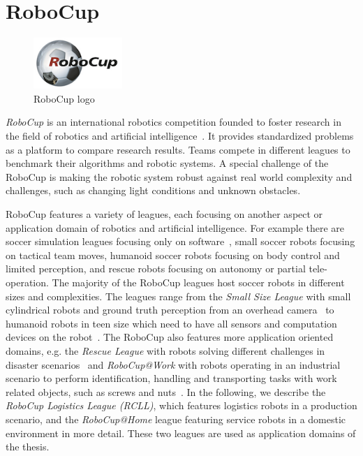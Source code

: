   
\section{RoboCup}
\label{sec:robocup}
\begin{figure}
  \centering
  \vspace{-2.7ex}
  \includegraphics[width=0.3\textwidth]{img/robocup-logo}
  \vspace{-4ex}
  \caption[RoboCup logo]{RoboCup logo}
  \label{fig:rcll}
  \vspace{-2ex}
\end{figure}
\emph{RoboCup} is an international robotics competition founded to
foster research in the field of robotics and artificial
intelligence~\cite{RoboCup-Paper,Gazsim-Thesis}. It provides
standardized problems as a platform to compare research results. Teams
compete in different leagues to benchmark their algorithms and robotic
systems. A special challenge of the RoboCup is making the robotic
system robust against real world complexity and challenges, such as
changing light conditions and unknown obstacles.

RoboCup features a variety of leagues, each focusing on another aspect
or application domain of robotics and artificial intelligence.  For
example there are soccer simulation leagues focusing only on
software~\cite{simspark_old}, small soccer robots focusing on tactical
team moves, humanoid soccer robots focusing on body control and
limited perception, and rescue robots focusing on autonomy or partial
tele-operation. The majority of the RoboCup leagues host soccer robots
in different sizes and complexities. The leagues range from the
\emph{Small Size League} with small cylindrical robots and ground
truth perception from an overhead camera~\cite{rc-ssl} to humanoid
robots in teen size which need to have all sensors and computation
devices on the robot~\cite{rc-book}. The RoboCup also features more
application oriented domains, e.g. the \emph{Rescue League} with
robots solving different challenges in disaster
scenarios~\cite{rc-rescue} and \emph{RoboCup@Work} with robots
operating in an industrial scenario to perform identification,
handling and transporting tasks with work related objects, such as
screws and nuts~\cite{rc-work}. In the following, we describe the
\emph{RoboCup Logistics League (RCLL)}, which features logistics
robots in a production scenario, and the \emph{RoboCup@Home} league
featuring service robots in a domestic environment in more
detail. These two leagues are used as application domains of the
thesis.

